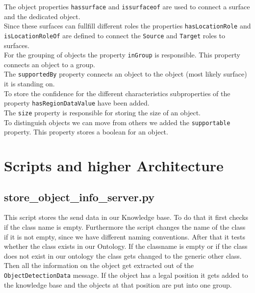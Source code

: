 \documentclass[main.tex]{subfiles}
\begin{document}
The object properties \texttt{hassurface} and \texttt{issurfaceof} are used to connect a surface and the dedicated object.\\
Since these surfaces can fullfill different roles the properties \texttt{hasLocationRole} and \texttt{isLocationRoleOf} are defined to connect the \texttt{Source} and \texttt{Target} roles to surfaces.\\
For the grouping of objects the property \texttt{inGroup} is responsible. This property connects an object to a group.\\
The \texttt{supportedBy} property connects an object to the object (most likely surface) it is standing on.\\
To store the confidence for the different characteristics subproperties of the property \texttt{hasRegionDataValue} have been added.\\
The \texttt{size} property is responsible for storing the size of an object.\\
To distinguish objects we can move from others we added the \texttt{supportable} property. This property stores a boolean for an object.



\section{Scripts and higher Architecture}
\subsection{store\_object\_info\_server.py}
This script stores the send data in our Knowledge base.
To do that it first checks if the class name is empty. Furthermore the script changes the name of the class if it is not empty, since we have different naming conventions. After that it tests whether the class exists in our Ontology. If the classname is empty or if the class does not exist in our ontology the class gets changed to the generic other class. Then all the information on the object get extracted out of the \texttt{ObjectDetectionData} message. If the object has a legal position it gets added to the knowledge base and the objects at that position are put into one group.

	\endgroup
\end{document}
